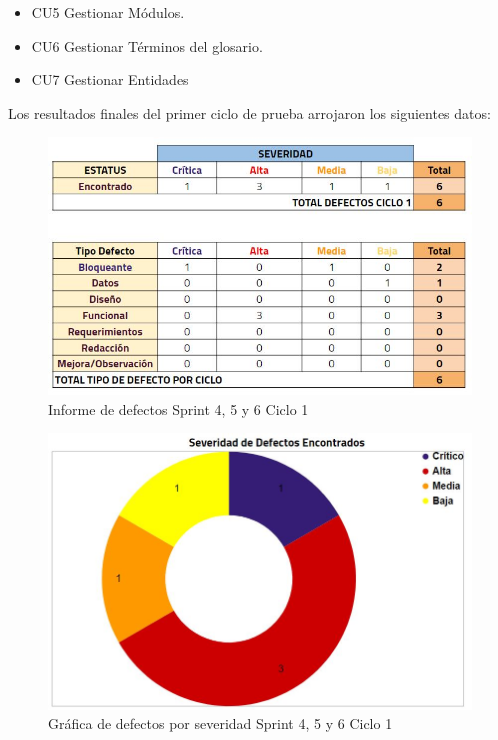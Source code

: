 \begin{itemize}
	\item CU5 Gestionar Módulos.
	\item CU6 Gestionar Términos del glosario.
	\item CU7 Gestionar Entidades
\end{itemize}

Los resultados finales del primer ciclo de prueba arrojaron los siguientes datos:

\begin{figure}[H]
	\begin{center}
		\includegraphics[width=.95\textwidth]{images/pruebas/s4c2}
		\caption{Informe de defectos Sprint 4, 5 y 6  Ciclo 1}
		\label{fig:infos4c2}
	\end{center}
\end{figure}

\begin{figure}[H]
	\begin{center}
		\includegraphics[width=.65\textwidth]{images/pruebas/s4c2-1}
		\caption{Gráfica de defectos por severidad Sprint 4, 5 y 6  Ciclo 1}
		\label{fig:infos4c2-1}
	\end{center}
\end{figure}

